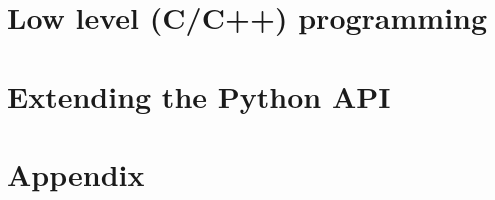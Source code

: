 \documentclass[11pt,fleqn]{book}
\begin{document}
 

 \thispagestyle{empty}
 \newpage
 \cleardoublepage 

 \pagestyle{plain}
 

 \cleardoublepage 
 
 \tableofcontents

 \newpage

 \cleardoublepage 

 \pagestyle{plain}
 
 
 
 
 \part{Low level (C/C++) programming}
%  
% 
% 
%  
% 
%   
% 
 \newpage
 
 \newpage
 
 \newpage
 
%   
%   
% 
% 
 \part{Extending the Python API}
 \newpage
 
 
% 
% 
%   
% 
%   
%   
%   
% 
% 
%  
%   
%   
%   
% 
% 
% 
%   
%   
%   
%   
%   
%   
%   
%   
%   
%  
%  
 \appendix 
 \part{Appendix}

  

 
 \newpage
 
 \newpage
 
 \newpage
 
 \newpage
 
 \newpage
 
\end{document}
